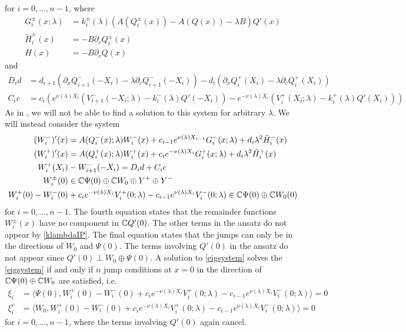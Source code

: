 \documentclass[10pt,reqno]{amsart}
\theoremstyle{plain}
\theoremstyle{definition}
\theoremstyle{remark}
\numberwithin{theorem}{section}
\numberwithin{equation}{section}
\begin{document}
for $i = 0, \dots, n-1$, where
\begin{equation}\label{defGH}
\begin{aligned}
G_i^\pm(x; \lambda) &= k_i^\pm(\lambda)\left( A(Q_i^\pm(x)) - A(Q(x)) - \lambda B \right) Q'(x) \\
\tilde{H}_i^\pm(x) &= -B \partial_c Q_i^\pm(x)\\
H(x) &= -B \partial_c Q(x)
\end{aligned}
\end{equation}
and
\begin{align}
D_i d &= d_{i+1}\left(\partial_x Q_{i+1}^-(-X_i) - \lambda \partial_c Q_{i+1}^-(-X_i)\right) - d_i \left( \partial_x Q_i^+(X_i) - \lambda \partial_c Q_i^+(X_i) \right) \label{defDid} \\
C_i c &= c_i \left( e^{\nu(\lambda) X_i} (V_{i+1}^-(-X_i; \lambda) - k_i^-(\lambda)Q'(-X_i)) - e^{-\nu(\lambda) X_i} (V_i^+(X_i; \lambda) - k_i^+(\lambda) Q'(X_i)) \right) \label{defCic}
\end{align}
As in \cite{Sandstede1998}, we will not be able to find a solution to this system for arbitrary $\lambda$. We will instead consider the system
\begin{equation}\label{eigsystem}
\begin{aligned}
(W_i^-)'(x) &= A(Q_i^-(x); \lambda) W_i^-(x) + c_{i-1} e^{\nu(\lambda)X_{i-1}}  G_i^-(x; \lambda) + d_i \lambda^2 \tilde{H}_i^-(x) \\
(W_i^+)'(x) &= A(Q_i^+(x); \lambda) W_i^+(x) + c_i e^{-\nu(\lambda)X_i}  G_i^+(x; \lambda) + d_i \lambda^2 \tilde{H}_i^+(x) \\
W_i^+(X_i) &- W_{i+1}^-(-X_i) = D_i d + C_i c \\
W_i^\pm(0) &\in \mathbb{C} \Psi(0) \oplus \mathbb{C} W_0 \oplus Y^+ \oplus Y^- \\
W_i^+(0) - W_i^-(0) &+ c_i e^{-\nu(\lambda)X_i}V_i^+(0; \lambda) - c_{i-1} e^{\nu(\lambda)X_i} V_i^-(0; \lambda) \in \mathbb{C} \Psi(0) \oplus \mathbb{C} W_0(0) 
\end{aligned}
\end{equation}
for $i = 0, \dots, n-1$. The fourth equation states that the remainder functions $W_i^\pm(x)$ have no component in $\mathbb{C} Q'(0)$. The other terms in the ansatz do not appear by \cref{klambdaIP}. The final equation states that the jumps can only be in the directions of $W_0$ and $\Psi(0)$. The terms involving $Q'(0)$ in the ansatz do not appear since $Q'(0) \perp W_0\oplus\Psi(0)$. A solution to \eqref{eigsystem} solves the \cref{eigsystem} if and only if $n$ jump conditions at $x = 0$ in the direction of $\mathbb{C} \Psi(0) \oplus \mathbb{C} W_0$ are satisfied, i.e.  
\begin{equation}\label{jumpxi1}
\begin{aligned}
\xi_i &= \langle \Psi(0), W_i^+(0) - W_i^-(0) + c_i e^{-\nu(\lambda)X_i}V_i^+(0; \lambda) - c_{i-1} e^{\nu(\lambda)X_i} V_i^-(0; \lambda) \rangle = 0  \\
\xi_i^c &= \langle W_0, W_i^+(0) - W_i^-(0) + c_i e^{-\nu(\lambda)X_i}V_i^+(0; \lambda) - c_{i-1} e^{\nu(\lambda)X_i} V_i^-(0; \lambda) \rangle = 0 
\end{aligned}
\end{equation}
for $i = 0, \dots, n-1$, where the terms involving $Q'(0)$ again cancel.
\end{document}
